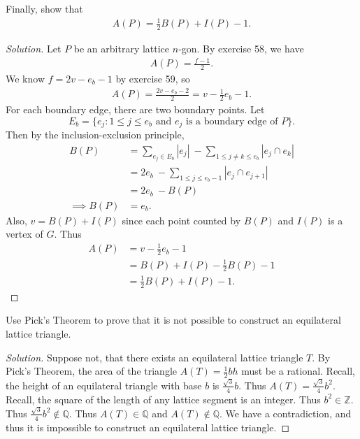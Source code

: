 \documentclass[12pt]{article}
\newcommand{\Z}{\mathbb{Z}}
\newcommand{\Q}{\mathbb{Q}}
\newenvironment{exercise}[2][Exercise]{\begin{trivlist}
        \item[\hskip \labelsep {\bfseries #1}\hskip \labelsep {\bfseries #2.}]}{\end{trivlist}}
\newenvironment{solution}
        {\begin{proof}[Solution]}
                    {\end{proof}}
\begin{document}
\begin{exercise}{60}
    Finally, show that
    \begin{align*}
        A(P) = \frac{1}{2} B(P) + I(P) -1 .
    \end{align*}
    \begin{solution}
        Let \( P \) be an arbitrary lattice \( n \)-gon. By exercise 58, we have
        \begin{align*}
            A(P) = \frac{f-1}{2} .
        \end{align*}
        We know \( f = 2v- e_{b} - 1 \) by exercise 59, so
        \begin{align*}
            A(P) = \frac{2v-e_{b} -2}{2} = v - \frac{1}{2} e_{b} - 1 .
        \end{align*}
        For each boundary edge, there are two boundary points. Let
        $$ E_{b} = \{e_{j} : 1 \leq j \leq e_{b} \text{ and } e_{j} \text{ is a boundary edge of } P\} . $$
        Then by the inclusion-exclusion principle,
        \begin{align*}
            B(P) &= \sum_{e_{j} \in E_{b}} \left| e_{j} \right|\  - \sum_{1 \leq j \neq k \leq e_{b}} \left| e_{j} \cap e_{k} \right|\\
            &= 2 e_{b} \ - \sum_{1 \leq j \leq e_{b} -1} \left|e_{j} \cap e_{j+1}\right|\\
            &= 2 e_{b}\  - B(P)\\
            \implies B(P) &= e_{b} .
        \end{align*}
        Also, \( v = B(P) + I(P) \) since each point counted by \( B(P) \) and \( I(P) \) is a vertex of \( G. \) Thus
        \begin{align*}
            A(P) &= v - \frac{1}{2} e_{b} - 1 \\
            &= B(P) + I(P) - \frac{1}{2} B(P) -1\\
            &= \frac{1}{2} B(P) + I(P) -1.
        \end{align*}
    \end{solution}
\end{exercise}

\begin{exercise}{72}
    Use Pick's Theorem to prove that it is not possible to construct an equilateral lattice triangle.
    \begin{solution}
        Suppose not, that there exists an equilateral lattice triangle \( T. \) By Pick's Theorem, the area of the triangle \( A(T) = \frac{1}{2} bh \) must be a rational. Recall, the height of an equilateral triangle with base \( b \) is \( \frac{\sqrt{3}}{4} b. \) Thus \( A(T) = \frac{\sqrt{3}}{4} b^{2} . \) Recall, the square of the length of any lattice segment is an integer. Thus \( b^{2} \in \Z. \) Thus \( \frac{\sqrt{3}}{4} b^{2} \notin \Q. \) Thus \( A(T) \in \Q \) and \( A(T) \notin \Q. \) We have a contradiction, and thus it is impossible to construct an equilateral lattice triangle.
    \end{solution}
\end{exercise}
\end{document}
